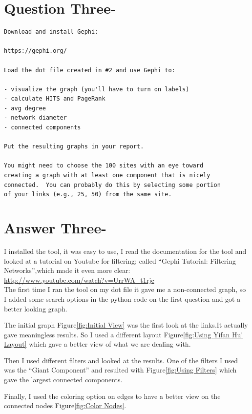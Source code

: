 \documentclass[letterpaper,11pt]{article}
\begin{document}
\section*{Question Three-}
\begin{verbatim}
Download and install Gephi:

https://gephi.org/

Load the dot file created in #2 and use Gephi to:

- visualize the graph (you'll have to turn on labels)
- calculate HITS and PageRank
- avg degree
- network diameter
- connected components

Put the resulting graphs in your report.

You might need to choose the 100 sites with an eye toward
creating a graph with at least one component that is nicely
connected.  You can probably do this by selecting some portion
of your links (e.g., 25, 50) from the same site. 
\end{verbatim}
\pagebreak

\section*{Answer Three-}
I installed the tool, it was easy to use, I read the documentation for the tool and looked at a tutorial on Youtube for filtering; called “Gephi Tutorial: Filtering Networks”,which made it even more clear:
\\
\url{http://www.youtube.com/watch?v=UrrWA_t1rjc}
\\ 

The first  time I ran the tool on my dot file it gave me a non-connected graph, so I added some search options in the python code on the first question and got a better looking graph.

The initial graph Figure\ref{fig:Initial View} was the first look at the links.It actually gave meaningless results. So I used a different layout Figure\ref{fig:Using Yifan Hu' Layout} which gave a better view of what we are dealing with.

Then I used different filters and looked at the results. One of the filters I used was the “Giant Component” and resulted with Figure\ref{fig:Using Filters} which gave the largest connected components.

Finally, I used the coloring option on edges to have a better view on the connected nodes Figure\ref{fig:Color Nodes}.
\end{document}
